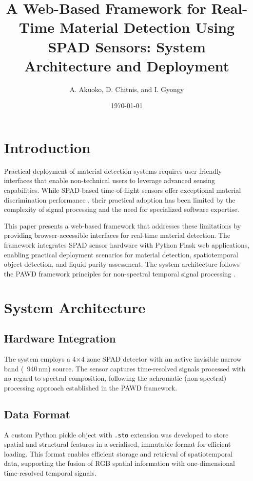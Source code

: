 \documentclass[10pt,twocolumn]{article}
\title{A Web-Based Framework for Real-Time Material Detection Using SPAD Sensors: System Architecture and Deployment}
\author{A. Akuoko, D. Chitnis, and I. Gyongy}
\date{\today}
\begin{document}
\maketitle

\section{Introduction}

Practical deployment of material detection systems requires user-friendly interfaces that enable non-technical users to leverage advanced sensing capabilities. While SPAD-based time-of-flight sensors offer exceptional material discrimination performance \cite{su2016,becker2023,tafone2023}, their practical adoption has been limited by the complexity of signal processing and the need for specialized software expertise.

This paper presents a web-based framework that addresses these limitations by providing browser-accessible interfaces for real-time material detection. The framework integrates SPAD sensor hardware with Python Flask web applications, enabling practical deployment scenarios for material detection, spatiotemporal object detection, and liquid purity assessment. The system architecture follows the PAWD framework principles for non-spectral temporal signal processing \cite{tontini2020}.

\section{System Architecture}

\subsection{Hardware Integration}

The system employs a 4$\times$4 zone SPAD detector with an active invisible narrow band (~940\,nm) source. The sensor captures time-resolved signals processed with no regard to spectral composition, following the achromatic (non-spectral) processing approach established in the PAWD framework.

\subsection{Data Format}

A custom Python pickle object with \texttt{.sto} extension was developed to store spatial and structural features in a serialised, immutable format for efficient loading. This format enables efficient storage and retrieval of spatiotemporal data, supporting the fusion of RGB spatial information with one-dimensional time-resolved temporal signals.
\end{document}
